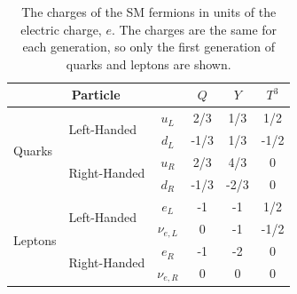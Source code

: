 \begin{table}[ht]
\centering
\begin{tabular}{llc|ccc}
  \multicolumn{3}{c|}{Particle} & $Q$ & $Y$ & $T^3$\\
\hline
\hline
\multirow{4}{*}{Quarks} & \multirow{2}{*}{Left-Handed}&  $u_L$   &  2/3  &1/3 & 1/2  \\
                       &                              &  $d_L$  & -1/3   &1/3& -1/2 \\
		       \cline{2-6}
                       &\multirow{2}{*}{Right-Handed}&  $u_R$   & 2/3  & 4/3 & 0 \\
                       &                             &  $d_R$  & -1/3   &-2/3& 0\\
\hline
\hline
\multirow{4}{*}{Leptons}&\multirow{2}{*}{Left-Handed} &$e_L$     & -1  & -1& 1/2\\
                        &                             & $\nu_{e,L}$  & 0 &-1&-1/2 \\
		       \cline{2-6}
                        &\multirow{2}{*}{Right-Handed} &$e_R$     & -1  & -2& 0\\
                        &                              & $\nu_{e,R}$  & 0 &0 &0 \\
\end{tabular}
\caption{The charges of the SM fermions in units of the electric charge, $e$. The charges are the same
for each generation, so only the first generation of quarks
and leptons are shown.  } %
\label{tab:ewcharges}
\end{table}

